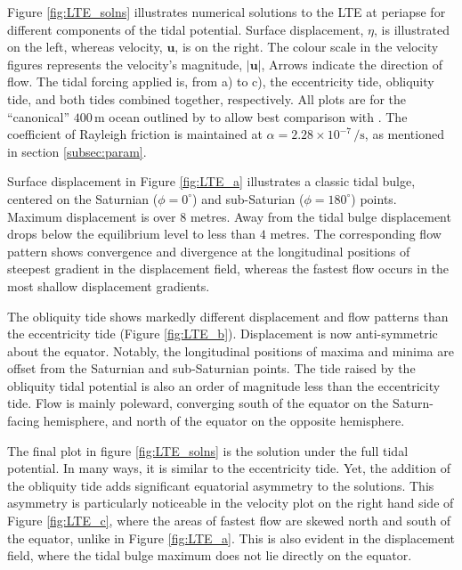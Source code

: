 Figure \ref{fig:LTE_solns} illustrates numerical solutions to the LTE at periapse for different components of the tidal potential. Surface displacement, $\eta$, is illustrated on the left, whereas velocity, $\bm{u}$, is on the right. The colour scale in the velocity figures represents the velocity's magnitude, $\left| \bm{u} \right|$, Arrows indicate the direction of flow. The tidal forcing applied is, from a) to c), the eccentricity tide, obliquity tide, and both tides combined together, respectively. All plots are for the ``canonical'' $400 \, \si{\metre}$ ocean outlined by \citet{sagan1982tide} to allow best comparison with \citet{sears1994tidal,sears1995tidal,sohl1995tidal}. The coefficient of Rayleigh friction is maintained at $\alpha = 2.28 \times 10^{-7} \, \si{\per\second}$, as mentioned in section \ref{subsec:param}.

Surface displacement in Figure \ref{fig:LTE_a} illustrates a classic tidal bulge, centered on the Saturnian ($\phi = 0^{\circ}$) and sub-Saturian ($\phi = 180^{\circ}$) points. Maximum displacement is over $8$ metres. Away from the tidal bulge displacement drops below the equilibrium level to less than $4$ metres. The corresponding flow pattern shows convergence and divergence at the longitudinal positions of steepest gradient in the displacement field, whereas the fastest flow occurs in the most shallow displacement gradients.

The obliquity tide shows markedly different displacement and flow patterns than the eccentricity tide (Figure \ref{fig:LTE_b}). Displacement is now anti-symmetric about the equator. Notably, the longitudinal positions of maxima and minima are offset from the Saturnian and sub-Saturnian points. The tide raised by the obliquity tidal potential is also an order of magnitude less than the eccentricity tide. Flow is mainly poleward, converging south of the equator on the Saturn-facing hemisphere, and north of the equator on the opposite hemisphere.

The final plot in figure \ref{fig:LTE_solns} is the solution under the full tidal potential. In many ways, it is similar to the eccentricity tide. Yet, the addition of the obliquity tide adds significant equatorial asymmetry to the solutions. This asymmetry is particularly noticeable in the velocity plot on the right hand side of Figure \ref{fig:LTE_c}, where the areas of fastest flow are skewed north and south of the equator, unlike in Figure \ref{fig:LTE_a}. This is also evident in the displacement field, where the tidal bulge maximum does not lie directly on the equator.

